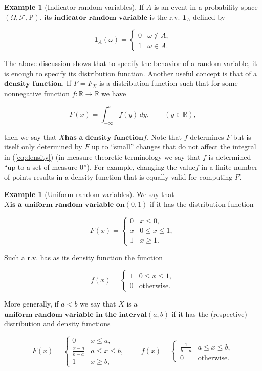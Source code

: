 \documentclass[11pt]{report}
\providecommand{\cal}{\mathcal}
\newcommand{\R}{\mathbb{R}}
\theoremstyle{plain}
\theoremstyle{definition}
\newtheorem{example}[thm]{Example}
\begin{document}
\begin{example}[Indicator random variables]
If $A$ is an event in a probability space
$(\Omega, {\cal F}, \mathrm{P})$, its
$\textbf{indicator random variable}$ is the r.v.
$\mathbf{1}_A$ defined by

\[
\mathbf{1}_A(\omega) = \begin{cases} 0 & \omega \notin A, \\ 1 & \omega \in A. \end{cases}
\]

The above discussion shows that to specify the
behavior of a random variable, it is enough to specify
its distribution function. Another useful concept is
that of a $\textbf{density function}$. If $F=F_X$ is
a distribution function such that for some nonnegative
function $f:\R\to\R$ we have

\begin{equation*} \tag{14}\label{eq:density}
F(x) = \int_{-\infty}^x f(y)\,dy, \qquad (y\in\R),
\end{equation*}

then we say that $\textbf{$X$has a density function$f
$}$. Note that $f$ determines $F$ but is itself only
determined by $F$ up to ``small'' changes that do not
affect the integral in (\ref{eq:density}) (in
measure-theoretic terminology we say that $f$ is
determined ``up to a set of measure $0$''). For
example, changing the value$f$ in a finite number of
points results in a density function that is equally
valid for computing $F$.
\end{example}

\begin{example}[Uniform random variables]
We say that $\textbf{$X
$is a uniform random variable on$(0,1)$}$ if it has
the distribution function

\[
F(x) = \begin{cases} 0 & x \le 0, \\
x & 0\le x \le 1, \\
1 & x \ge 1.
\end{cases}
\]

Such a r.v. has as its density function the function

\[
f(x) = \begin{cases} 1 & 0\le x\le 1,\\ 0&\textrm{otherwise.}\end{cases}
\]

More generally, if $a<b$ we say that $X$ is a
$\textbf{uniform random variable in the interval$(a,b)
$}$ if it has the (respective) distribution and
density functions

\[
F(x) = \begin{cases} 0 & x \le a, \\ \frac{x-a}{b-a} & a\le x\le b, \\ 1 & x\ge b, \end{cases}
\qquad
f(x) = \begin{cases} \frac{1}{b-a} & a\le x\le b, \\ 0 & \textrm{otherwise.}
\end{cases}
\]

\end{example}
\end{document}
